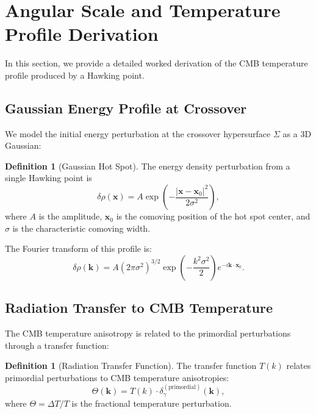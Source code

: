 \documentclass[11pt,a4paper]{article}
\theoremstyle{plain}
\theoremstyle{definition}
\newtheorem{definition}[theorem]{Definition}
\theoremstyle{remark}
\begin{document}
\section{Angular Scale and Temperature Profile Derivation}\label{sec:angular_scale}

In this section, we provide a detailed worked derivation of the CMB temperature profile produced by a Hawking point.

\subsection{Gaussian Energy Profile at Crossover}

We model the initial energy perturbation at the crossover hypersurface $\Sigma$ as a 3D Gaussian:

\begin{definition}[Gaussian Hot Spot]\label{def:gaussian_spot}
The energy density perturbation from a single Hawking point is
\begin{equation}\label{eq:gaussian_profile}
    \delta\rho(\bm{x}) = A \exp\left( -\frac{|\bm{x} - \bm{x}_0|^2}{2\sigma^2} \right),
\end{equation}
where $A$ is the amplitude, $\bm{x}_0$ is the comoving position of the hot spot center, and $\sigma$ is the characteristic comoving width.
\end{definition}

The Fourier transform of this profile is:
\begin{equation}\label{eq:gaussian_fourier}
    \delta\rho(\bm{k}) = A (2\pi\sigma^2)^{3/2} \exp\left( -\frac{k^2 \sigma^2}{2} \right) e^{-i\bm{k}\cdot\bm{x}_0}.
\end{equation}

\subsection{Radiation Transfer to CMB Temperature}

The CMB temperature anisotropy is related to the primordial perturbations through a transfer function:

\begin{definition}[Radiation Transfer Function]\label{def:transfer}
The transfer function $T(k)$ relates primordial perturbations to CMB temperature anisotropies:
\begin{equation}
    \Theta(\bm{k}) = T(k) \cdot \delta_\gamma^{(\text{primordial})}(\bm{k}),
\end{equation}
where $\Theta = \Delta T / T$ is the fractional temperature perturbation.
\end{definition}
\end{document}
